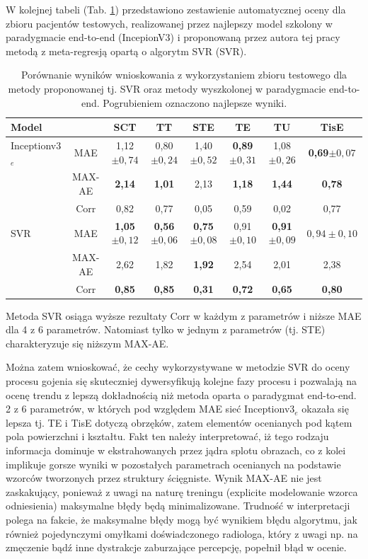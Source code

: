 W kolejnej tabeli (Tab. \ref{tab:end-to-end_testset}) przedstawiono zestawienie automatycznej oceny dla zbioru pacjentów testowych, realizowanej przez najlepszy model szkolony w paradygmacie end-to-end (IncepionV3) i proponowaną przez autora tej pracy metodą z meta-regresją opartą o algorytm SVR (SVR).  
\renewcommand{\arraystretch}{1.2}
\begin{table}[t]
	\caption{Porównanie wyników wnioskowania z wykorzystaniem zbioru testowego dla metody proponowanej tj. SVR oraz metody wyszkolonej w paradygmacie end-to-end. Pogrubieniem oznaczono najlepsze wyniki.}
	\scriptsize
	\begin{center}
		\begin{tabular}{lc||c|c|c|c|c|c}
			\textbf{Model} & & \textbf{SCT} & \textbf{TT} & \textbf{STE} & \textbf{TE} & \textbf{TU} & \textbf{TisE}\\ \hline \hline
			Inceptionv3$_{e}$ & MAE & 1,12$\pm{0,74}$ & 0,80$\pm{0,24}$ & 1,40$\pm{0,52}$ & \textbf{0,89}$\pm{0,31}$ & 1,08$\pm{0,26}$ & \textbf{0,69}$\pm{0,07}$ \\
			& MAX-AE & \textbf{2,14} & \textbf{1,01} & 2,13 & \textbf{1,18} & \textbf{1,44} & \textbf{0,78} \\
			& Corr & 0,82 & 0,77 & 0,05 & 0,59 & 0,02 & 0,77 \\ \hline
			SVR & MAE & \textbf{1,05}$\pm0,12$ & \textbf{0,56}$\pm0,06$ & \textbf{0,75}$\pm0,08$ & 0,91$\pm0,10$ & \textbf{0,91}$\pm0,09$ & $0,94\pm0,10$\\
			& MAX-AE & 2,62 & 1,82 & \textbf{1,92} & 2,54 & 2,01 & 2,38 \\
			& Corr & \textbf{0,85} & \textbf{0,85} & \textbf{0,31} & \textbf{0,72} & \textbf{0,65} & \textbf{0,80} 
		\end{tabular}
	\end{center}
	\label{tab:end-to-end_testset}
\end{table}
\renewcommand{\arraystretch}{1}

Metoda SVR osiąga wyższe rezultaty Corr w każdym z parametrów i niższe MAE dla 4 z 6 parametrów. Natomiast tylko w jednym z parametrów (tj. STE) charakteryzuje się niższym MAX-AE. 

Można zatem wnioskować, że cechy wykorzystywane w metodzie SVR do oceny procesu gojenia się skuteczniej dywersyfikują kolejne fazy procesu i pozwalają na ocenę trendu z lepszą dokładnością niż metoda oparta o paradygmat end-to-end. 2 z 6 parametrów, w których pod względem MAE sieć Inceptionv3$_e$ okazała się lepsza tj. TE i TisE dotyczą obrzęków, zatem elementów ocenianych pod kątem pola powierzchni i kształtu. Fakt ten należy interpretować, iż tego rodzaju informacja dominuje w ekstrahowanych przez jądra splotu obrazach, co z kolei implikuje gorsze wyniki w pozostałych parametrach ocenianych na podstawie wzorców tworzonych przez struktury ścięgniste. Wynik MAX-AE nie jest zaskakujący, ponieważ z uwagi na naturę treningu (explicite modelowanie wzorca odniesienia) maksymalne błędy będą minimalizowane. Trudność w interpretacji polega na fakcie, że maksymalne błędy mogą być wynikiem błędu algorytmu, jak również pojedynczymi omyłkami doświadczonego radiologa, który z uwagi np. na zmęczenie bądź inne dystrakcje zaburzające percepcję, popełnił błąd w ocenie.  

